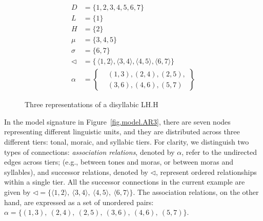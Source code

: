 \begin{figure}[ht]
\begin{minipage}[b]{0.4\textwidth}
		\label{fig.model.AR2}
	\end{minipage}
	\hfill
	\begin{minipage}[b]{0.3\textwidth}
		\small
		\centering
		\begin{align*}
			D &= \{1, 2, 3, 4, 5, 6, 7\} \\
			L &= \{1\}\\
			H &= \{2\}\\
			\mu &= \{3, 4, 5\}\\
			\sigma &= \{6, 7\} \\
			\lhd &= \{\, \langle 1,2 \rangle, \langle 3,4 \rangle, \langle 4,5 \rangle,
			\langle 6,7 \rangle\} \\
		\alpha &= \left\{
		\begin{aligned}
			&(1,3),(2,4),(2,5),\\
			&(3,6),(4,6),(5,7)
		\end{aligned}
		\right\}
		\end{align*}
		\label{fig.model.AR3}
	\end{minipage}
	
	
	\caption{Three representations of a disyllabic LH.H}
	\label{fig.model.AR}
\end{figure}


In the model signature in Figure~\ref{fig.model.AR3}, there are seven nodes representing different linguistic units, and they are distributed across three different tiers: tonal, moraic, and syllabic tiers. For clarity, 
we distinguish two types of connections: \textit{association relations}, 
denoted by $\alpha$, refer to the undirected edges across tiers; 
(e.g., between tones and moras, or between moras and syllables), 
and successor relations, denoted by $\lhd$, represent ordered relationships within a single tier. 
All the successor connections in the current example are given by
\( \lhd = \{\langle 1,2 \rangle,\ \langle 3,4 \rangle,\ \langle 4,5
\rangle,\ \langle 6,7 \rangle \}.\) The association relations, on the
other hand, are expressed as a set of unordered pairs:
\(\alpha = \{ (1,3),\ (2,4),\ (2,5),\ (3,6),\ (4,6),\ (5,7) \}.\)


